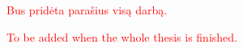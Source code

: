 
\textcolor{red}{Bus pridėta parašius visą darbą.}








\textcolor{red}{To be added when the whole thesis is finished.}
